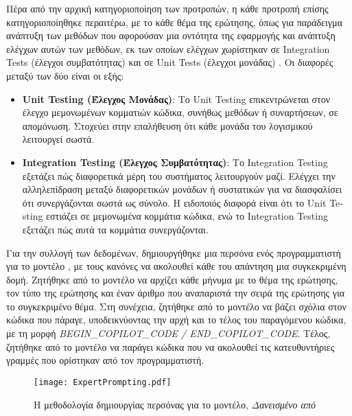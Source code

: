 Πέρα από την αρχική κατηγοριοποίηση των προτροπών, η κάθε προτροπή
επίσης κατηγοριοποίηθηκε περαιτέρω, με το κάθε θέμα της ερώτησης, όπως
για παράδειγμα ανάπτυξη των μεθόδων που αφορούσαν μια οντότητα της
εφαρμογής και ανάπτυξη ελέγχων αυτών των μεθόδων, εκ των οποίων ελέγχων
χωρίστηκαν σε \textlatin{Integration Tests} (έλεγχοι συμβατότητας) και
σε \textlatin{Unit Tests} (έλεγχοι μονάδας) \cite{jamilTesting,
  Kathiriya}. Οι διαφορές μεταξύ των δύο είναι οι εξής:
\begin{itemize}
\item
  \textbf{\textlatin{Unit Testing} (Έλεγχος Μονάδας)}: Το
  \textlatin{Unit Testing} επικεντρώνεται στον έλεγχο μεμονωμένων
  κομματιών κώδικα, συνήθως μεθόδων ή συναρτήσεων, σε απομόνωση.
  Στοχεύει στην επαλήθευση ότι κάθε μονάδα του λογισμικού λειτουργεί
  σωστά.
\item
  \textbf{\textlatin{Integration Testing} (Έλεγχος Συμβατότητας)}: Το
  \textlatin{Integration Testing} εξετάζει πώς διαφορετικά μέρη του
  συστήματος λειτουργούν μαζί. Ελέγχει την αλληλεπίδραση μεταξύ
  διαφορετικών μονάδων ή συστατικών για να διασφαλίσει ότι συνεργάζονται
  σωστά ως σύνολο. Η ειδοποιός διαφορά είναι ότι το \textlatin{Unit
    Testing} εστιάζει σε μεμονωμένα κομμάτια κώδικα, ενώ το
  \textlatin{Integration Testing} εξετάζει πώς αυτά τα κομμάτια
  συνεργάζονται. \cite{patton2005software}
\end{itemize}

Για την συλλογή των δεδομένων, δημιουργήθηκε μια περσόνα ενός
προγραμματιστή για το μοντέλο \cite{zhou2024sotopia,AitBaha2023,
  xu2023expertprompting}, με τους κανόνες να ακολουθεί κάθε του απάντηση
μια συγκεκριμένη δομή. Ζητήθηκε από το μοντέλο να αρχίζει κάθε μήνυμα με
το θέμα της ερώτησης, τον τύπο της ερώτησης και έναν άριθμο που
αναπαριστά την σειρά της ερώτησης για το συγκεκριμένο θέμα. Στη
συνέχεια, ζητήθηκε από το μοντέλο να βάζει σχόλια στον κώδικα που
πάραγε, υποδεικνύοντας την αρχή και το τέλος του παραγόμενου κώδικα, με
τη μορφή \textlatin{\textit{BEGIN\_COPILOT\_CODE / END\_COPILOT\_CODE}}.
Τέλος, ζητήθηκε από το μοντέλο να παράγει κώδικα που να ακολουθεί τις
κατευθυντήριες γραμμές που ορίστηκαν από τον προγραμματιστή.

\begin{figure}[H]
  \begin{center}
    \texttt{[image: ExpertPrompting.pdf]}
    \label{fig:ExpertPrompting}
    \caption{Η μεθοδολογία δημιουργίας περσόνας για το μοντέλο,
      \textit{Δανεισμένο από \cite{xu2023expertprompting}} }
  \end{center}
\end{figure}

